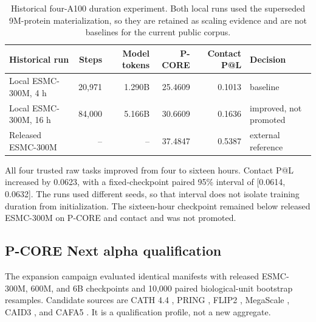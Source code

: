\documentclass{article}
\begin{document}
\begin{table}[H]
  \centering
  \small
  \begin{tabular}{@{}lrrrrl@{}}
    \toprule
    Historical run & Steps & Model tokens & P-CORE & Contact P@L & Decision \\
    \midrule
    Local ESMC-300M, 4 h & 20,971 & 1.290B & 25.4609 & 0.1013 & baseline \\
    Local ESMC-300M, 16 h & 84,000 & 5.166B & 30.6609 & 0.1636 & improved, not promoted \\
    Released ESMC-300M & -- & -- & 37.4847 & 0.5387 & external reference \\
    \bottomrule
  \end{tabular}
  \caption{Historical four-A100 duration experiment. Both local runs used the
  superseded 9M-protein materialization, so they are retained as scaling
  evidence and are not baselines for the current public corpus.}
  \label{tab:historical-duration}
\end{table}

All four trusted raw tasks improved from four to sixteen hours. Contact P@L
increased by 0.0623, with a fixed-checkpoint paired 95\% interval of
[0.0614, 0.0632]. The runs used different seeds, so that interval does not
isolate training duration from initialization. The sixteen-hour checkpoint
remained below released ESMC-300M on P-CORE and contact and was not promoted.

\subsection{P-CORE Next alpha qualification}

The expansion campaign evaluated identical manifests with released ESMC-300M,
600M, and 6B checkpoints and 10,000 paired biological-unit bootstrap
resamples. Candidate sources are CATH 4.4 \citep{waman2025cath44}, PRING
\citep{zheng2025pring}, FLIP2 \citep{didi2026flip2}, MegaScale
\citep{tsuboyama2023megascale}, CAID3 \citep{mehdiabadi2026caid3}, and CAFA5
\citep{depaolis2026cafa5}. It is a qualification profile, not a new aggregate.
\end{document}
